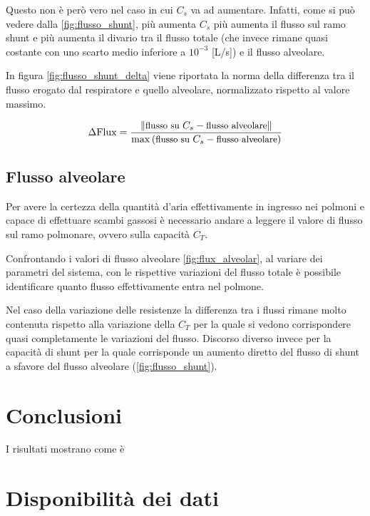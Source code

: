 Questo non è però vero nel caso in cui $C_s$ va ad aumentare. Infatti, come si può vedere dalla \cref{fig:flusso_shunt}, più aumenta $C_s$ più aumenta il flusso sul ramo shunt e più aumenta il divario tra il flusso totale (che invece rimane quasi costante con uno scarto medio inferiore a $10^{-3}$ [L/s]) e il flusso alveolare.

In figura \cref{fig:flusso_shunt_delta} viene riportata la norma della differenza tra il flusso erogato dal respiratore e quello alveolare, normalizzato rispetto al valore massimo. 

\begin{equation}
	\small{
\Delta \mathrm{Flux}={	\|\text{flusso su }C_s - \text{flusso alveolare}\|\over \max\left(\text{flusso su }C_s - \text{flusso alveolare}\right)}}
\label{eq:shunt_Delta}
\end{equation}

\subsection{Flusso alveolare}

Per avere la certezza della quantità d'aria effettivamente in ingresso nei polmoni e capace di effettuare scambi gassosi è necessario andare a leggere il valore di flusso sul ramo polmonare, ovvero sulla capacità $C_T$. 

Confrontando i valori di flusso alveolare \cref{fig:flux_alveolar}, al variare dei parametri del sistema, con le rispettive variazioni del flusso totale è possibile identificare quanto flusso effettivamente entra nel polmone. 

Nel caso della variazione delle resistenze la differenza tra i flussi rimane molto contenuta rispetto alla variazione della $C_T$ per la quale si vedono corrispondere quasi completamente le variazioni del flusso. Discorso diverso invece per la capacità di shunt per la quale corrisponde un aumento diretto del flusso di shunt a sfavore del flusso alveolare (\cref{fig:flusso_shunt}).

\section{Conclusioni}

I risultati mostrano come è 

\textcolor{blue}{
	\lipsum[1-2]
}
\section*{Disponibilità dei dati}


